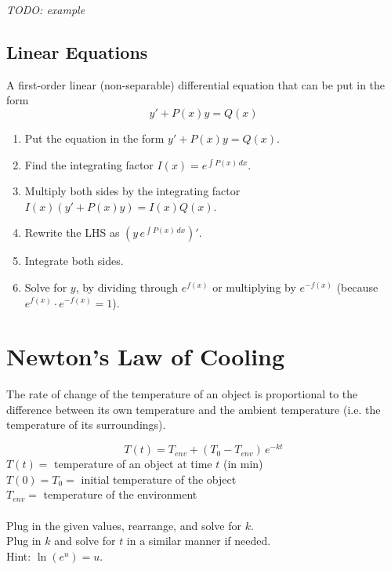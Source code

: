 \documentclass[8pt,letterpaper]{article}
\begin{document}
\emph{TODO: example}\\

\subsection*{Linear Equations} %
A first-order linear (non-separable) differential equation that can be put in the form
\begin{equation*}
y' + P(x)y = Q(x)
\end{equation*}

\begin{enumerate}
\item Put the equation in the form $y' + P(x)y = Q(x)$.
\item Find the integrating factor $I(x) = e^{\int P(x)\, dx}$.
\item Multiply both sides by the integrating factor $I(x)(y' + P(x)y) = I(x)Q(x)$.
\item Rewrite the LHS as $(y \, e^{\int P(x)\, dx})'$.
\item Integrate both sides.
\item Solve for $y$, by dividing through $e^{f(x)}$ or multiplying by $e^{-f(x)}$
(because $e^{f(x)} \cdot e^{-f(x)} = 1$).
\end{enumerate}


\section{Newton's Law of Cooling}
The rate of change of the temperature of an object is proportional to the
difference between its own temperature and the ambient temperature (i.e. the
temperature of its surroundings).

\begin{equation}
T(t) = T_{env} + (T_0 - T_{env}) \, e^{-kt}
\end{equation}
$T(t) = $ temperature of an object at time $t$ (in min) \\
$T(0) = T_0 = $ initial temperature of the object \\
$T_{env} = $ temperature of the environment \\
\\
Plug in the given values, rearrange, and solve for $k$. \\
Plug in $k$ and solve for $t$ in a similar manner if needed. \\
Hint: $\ln(e^u) = u$.
\end{document}
